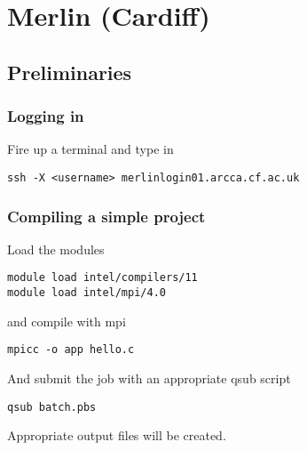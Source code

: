\chapter{Merlin (Cardiff)}

\section{Preliminaries}

\subsection{Logging in}


Fire up a terminal and type in 
\begin{verbatim}
ssh -X <username> merlinlogin01.arcca.cf.ac.uk
\end{verbatim}

\subsection{Compiling a simple project}

Load the modules
\begin{verbatim}
module load intel/compilers/11
module load intel/mpi/4.0
\end{verbatim}

and compile with mpi
\begin{verbatim}
mpicc -o app hello.c
\end{verbatim}

And submit the job with an appropriate qsub script
\begin{verbatim}
qsub batch.pbs
\end{verbatim}

Appropriate output files will be created.




